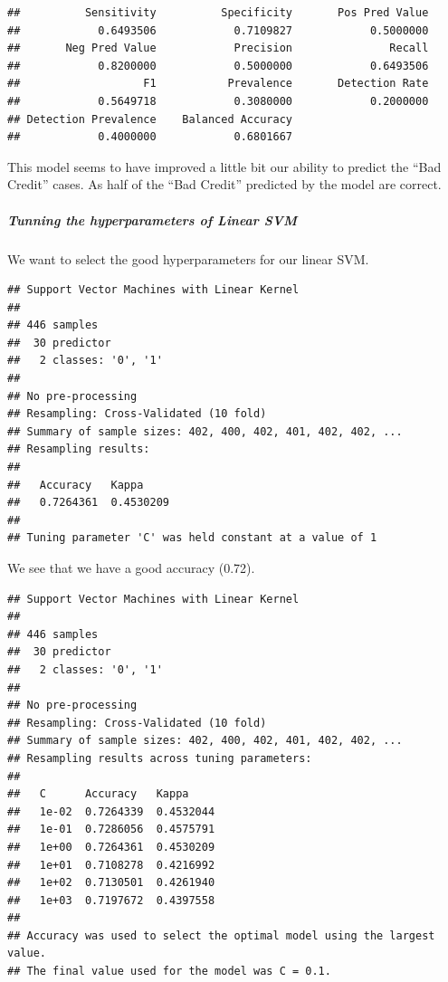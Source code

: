 \documentclass[
]{article}
\begin{document}
\begin{verbatim}
##          Sensitivity          Specificity       Pos Pred Value 
##            0.6493506            0.7109827            0.5000000 
##       Neg Pred Value            Precision               Recall 
##            0.8200000            0.5000000            0.6493506 
##                   F1           Prevalence       Detection Rate 
##            0.5649718            0.3080000            0.2000000 
## Detection Prevalence    Balanced Accuracy 
##            0.4000000            0.6801667
\end{verbatim}

This model seems to have improved a little bit our ability to predict
the ``Bad Credit'' cases. As half of the ``Bad Credit'' predicted by the
model are correct.

\hypertarget{tunning-the-hyperparameters-of-linear-svm}{%
\subparagraph{Tunning the hyperparameters of Linear
SVM}\label{tunning-the-hyperparameters-of-linear-svm}}

We want to select the good hyperparameters for our linear SVM.

\begin{verbatim}
## Support Vector Machines with Linear Kernel 
## 
## 446 samples
##  30 predictor
##   2 classes: '0', '1' 
## 
## No pre-processing
## Resampling: Cross-Validated (10 fold) 
## Summary of sample sizes: 402, 400, 402, 401, 402, 402, ... 
## Resampling results:
## 
##   Accuracy   Kappa    
##   0.7264361  0.4530209
## 
## Tuning parameter 'C' was held constant at a value of 1
\end{verbatim}

We see that we have a good accuracy (0.72).

\begin{verbatim}
## Support Vector Machines with Linear Kernel 
## 
## 446 samples
##  30 predictor
##   2 classes: '0', '1' 
## 
## No pre-processing
## Resampling: Cross-Validated (10 fold) 
## Summary of sample sizes: 402, 400, 402, 401, 402, 402, ... 
## Resampling results across tuning parameters:
## 
##   C      Accuracy   Kappa    
##   1e-02  0.7264339  0.4532044
##   1e-01  0.7286056  0.4575791
##   1e+00  0.7264361  0.4530209
##   1e+01  0.7108278  0.4216992
##   1e+02  0.7130501  0.4261940
##   1e+03  0.7197672  0.4397558
## 
## Accuracy was used to select the optimal model using the largest value.
## The final value used for the model was C = 0.1.
\end{verbatim}
\end{document}

